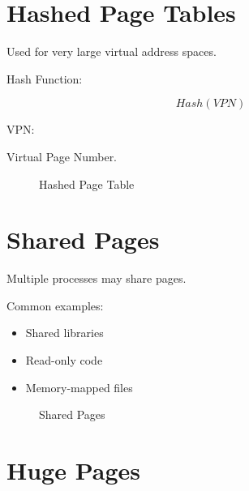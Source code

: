 \section{Hashed Page Tables}

Used for very large virtual address spaces.

Hash Function:

\[
Hash(VPN)
\]

VPN:

Virtual Page Number.

\begin{figure}[H]
\centering
{}
\caption{Hashed Page Table}
\end{figure}

\section{Shared Pages}

Multiple processes may share pages.

Common examples:

\begin{itemize}
\item Shared libraries
\item Read-only code
\item Memory-mapped files
\end{itemize}

\begin{figure}[H]
\centering
{}
\caption{Shared Pages}
\end{figure}

\section{Huge Pages}

